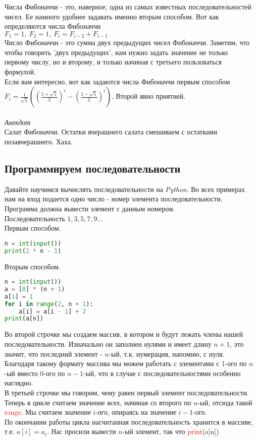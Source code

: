 \documentclass[12pt]{article} %
\begin{document}
\begin{tcolorbox}[colback=blue!5!white,colframe=blue!75!black,title={Математическая справка. Числа Фибоначчи.}]
	Числа Фибоначчи - это, наверное, одна из самых известных последовательностей чисел. Ее намного удобнее задавать именно вторым способом. Вот как определяются числа Фибоначчи\\
	$F_1 = 1,\  F_2 = 1,\ F_{i} = F_{i - 2} + F_{i - 1}$\\
	Число Фибоначчи - это сумма двух предыдущих чисел Фибоначчи. Заметим, что чтобы говорить 'двух предыдущих', нам нужно задать значение не только первому числу, но и второму, и только начиная с третьего пользоваться формулой.\\
	Если вам интересно, вот как задаются числа Фибоначчи первым способом\\
	$F_i = \frac{1}{\sqrt{5}} ((\frac{1 + \sqrt{5}}{2})^i - (\frac{1 - \sqrt{5}}{2})^i)$. Второй явно приятней.\\
	\\
	\textit{Анекдот}\\
	Салат Фибоначчи. Остатки вчерашнего салата смешиваем с остатками позавчерашнего. Хаха.
\end{tcolorbox}
\subsection{Программируем последовательности}
Давайте научимся вычислять последовательности на \textit{Python}. Во всех примерах нам на вход подается одно число - номер элемента последовательности. Программа должна вывести элемент с данным номером.\\
Последовательность $1, 3, 5, 7, 9 \ldots$ \\
Первым способом.
\begin{lstlisting}[language=Python]
n = int(input())
print(2 * n - 1)
\end{lstlisting}
Вторым способом.
\begin{lstlisting}[language=Python]
n = int(input())
a = [0] * (n + 1)
a[1] = 1
for i in range(2, n + 1):
	a[i] = a[i - 1] + 2
print(a[n])
\end{lstlisting}
Во второй строчке мы создаем массив, в котором и будут лежать члены нашей последовательности. Изначально он заполнен нулями и имеет длину $n + 1$, это значит, что последний элемент - $n$-ый, т.к. нумерация, напомню, с нуля. Благодаря такому формату массива мы можем работать с элементами с 1-ого по $n$-ый вместо 0-ого по $n-1$-ый, что в случае с последовательностями особенно наглядно.\\
В третьей строчке мы говорим, чему равен первый элемент последовательности. Теперь в цикле считаем значение всех, начиная со второго по $n$-ый, отсюда такой \textcolor{red}{range}. Мы считаем значение $i$-ого, опираясь на значение $i-1$-ого.\\
По окончании работы цикла насчитанная последовательность хранится в массиве, т.е. $a[i] = a_i$. Нас просили вывести $n$-ый элемент, так что \textcolor{red}{print}(a[n])
\end{document}
